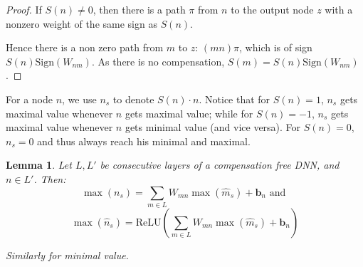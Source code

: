 \documentclass[]{article}
\newtheorem{lemma}{Lemma}
\theoremstyle{definition}
\newcommand{\ReLU}{\mathrm{ReLU}}
\begin{document}
\begin{proof}
	If $S(n) \neq 0$, then there is a path $\pi$ from $n$ to the output node $z$ with a nonzero weight of the same sign as $S(n)$. 
	
	Hence there is a non zero path from $m$ to $z$: $(m n) \pi$, which is of sign 
	$S(n)\mathrm{Sign}(W_{n m})$. As there is no compensation, $S(m)=S(n)\mathrm{Sign}(W_{n m})$.
\end{proof}


For a node $n$, we use $n_s$ to denote $S(n)\cdot n$. 
Notice that for $S(n)=1$, $n_s$ gets maximal value whenever $n$ gets maximal value; 
while for $S(n)=-1$, $n_s$ gets maximal value whenever $n$ gets minimal value (and vice versa). For $S(n)=0$, $n_s=0$ and thus always reach his minimal and maximal.



\begin{lemma}
	\label{lemma2}
	Let $L,L'$ be consecutive layers of a compensation free DNN, and $n \in L'$. 
	Then:
	$$ \max(n_s)=\sum_{m \in L}W_{m n} \max(\hat{m}_s)+\boldsymbol{b}_n \text{ and }$$
	$$\max(\hat{n}_s)=\ReLU(\sum_{m \in L}W_{m n} \max(\hat{m}_s)+\boldsymbol{b}_n)$$
	
	
	
	Similarly for minimal value.
	
	\end{lemma}
	
\end{document}
